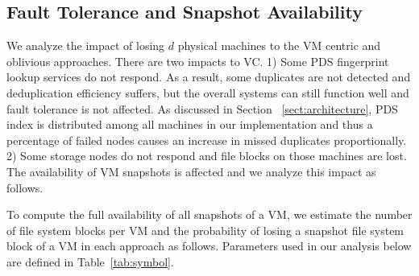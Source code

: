 \subsection{Fault Tolerance and Snapshot Availability}
\label{sect:fault}
We  analyze  the impact of losing $d$ physical machines 
to the VM centric and oblivious approaches.  
There are two impacts to VC. 
1) Some PDS fingerprint lookup services do not respond.  As  a result, some duplicates
are not detected and deduplication efficiency suffers, but the overall systems can still
function well and fault tolerance is not affected.  As discussed in Section ~\ref{sect:architecture}, 
PDS index is distributed
among all machines in our implementation and thus a percentage of failed nodes
causes an increase in missed duplicates proportionally.
2) Some storage nodes do not  respond and file blocks on those machines are lost. The availability of
VM snapshots is affected and we analyze this impact as follows.


To compute the full availability of all snapshots of a VM, we estimate
the number of file system blocks per VM and the probability of losing a snapshot file system 
block of a VM in each approach as follows.
Parameters used in our analysis below are defined in Table~\ref{tab:symbol}. 

